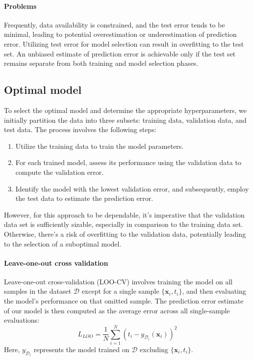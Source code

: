 \paragraph*{Problems}
Frequently, data availability is constrained, and the test error tends to be minimal, leading to potential overestimation or underestimation of prediction error.
Utilizing test error for model selection can result in overfitting to the test set.
An unbiased estimate of prediction error is achievable only if the test set remains separate from both training and model selection phases.

\subsection{Optimal model}
To select the optimal model and determine the appropriate hyperparameters, we initially partition the data into three subsets: training data, validation data, and test data. 
The process involves the following steps:
\begin{enumerate}
    \item Utilize the training data to train the model parameters.
    \item For each trained model, assess its performance using the validation data to compute the validation error.
    \item Identify the model with the lowest validation error, and subsequently, employ the test data to estimate the prediction error.
\end{enumerate}
However, for this approach to be dependable, it's imperative that the validation data set is sufficiently sizable, especially in comparison to the training data set. 
Otherwise, there's a risk of overfitting to the validation data, potentially leading to the selection of a suboptimal model.

\paragraph*{Leave-one-out cross validation}
Leave-one-out cross-validation (LOO-CV) involves training the model on all samples in the dataset $\mathcal{D}$ except for a single sample $\{\textbf{x}_i,t_i\}$, and then evaluating the model's performance on that omitted sample. 
The prediction error estimate of our model is then computed as the average error across all single-sample evaluations:
\[L_{LOO}=\dfrac{1}{N}\sum_{i=1}^{N}\left( t_i-y_{\mathcal{D}_i}(\textbf{x}_i) \right)^2\]
Here, $y_{\mathcal{D}_i}$ represents the model trained on $\mathcal{D}$ excluding $\{\textbf{x}_i,t_i\}$. 

